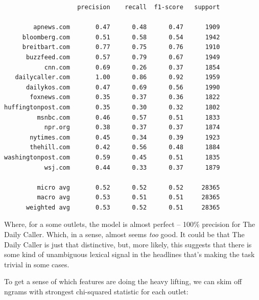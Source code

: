 \documentclass{scrartcl}
\begin{document}
\begin{lstlisting}
                    precision    recall  f1-score   support

        apnews.com       0.47      0.48      0.47      1909
     bloomberg.com       0.51      0.58      0.54      1942
     breitbart.com       0.77      0.75      0.76      1910
      buzzfeed.com       0.57      0.79      0.67      1949
           cnn.com       0.69      0.26      0.37      1854
   dailycaller.com       1.00      0.86      0.92      1959
      dailykos.com       0.47      0.69      0.56      1990
       foxnews.com       0.35      0.37      0.36      1822
huffingtonpost.com       0.35      0.30      0.32      1802
         msnbc.com       0.46      0.57      0.51      1833
           npr.org       0.38      0.37      0.37      1874
       nytimes.com       0.45      0.34      0.39      1923
       thehill.com       0.42      0.56      0.48      1884
washingtonpost.com       0.59      0.45      0.51      1835
           wsj.com       0.44      0.33      0.37      1879

         micro avg       0.52      0.52      0.52     28365
         macro avg       0.53      0.51      0.51     28365
      weighted avg       0.53      0.52      0.51     28365
\end{lstlisting}

Where, for a some outlets, the model is almost perfect -- 100\% precision for The Daily Caller. Which, in a sense, almost seems \textit{too} good. It could be that The Daily Caller is just that distinctive, but, more likely, this suggests that there is some kind of unambiguous lexical signal in the headlines that's making the task trivial in some cases.

To get a sense of which features are doing the heavy lifting, we can skim off ngrams with strongest chi-squared statistic for each outlet:
\end{document}
